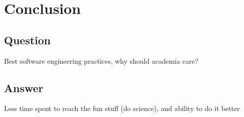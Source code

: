 \documentclass[usenames,dvipsnames]{beamer}
\theoremstyle{plain}
\theoremstyle{definition}
\begin{document}
\section{Conclusion}
\subsection{Question}


\begin{frame}{\setframetitle{}}
  {
\centering


\Large  Best software engineering practices, why should
academia care?

}
\end{frame}

\subsection{Answer}


\begin{frame}{\setframetitle{}}
  {
\centering
\Large  Less time spent to reach the fun stuff (do science), and ability to do
it better
}
\end{frame}
\end{document}
